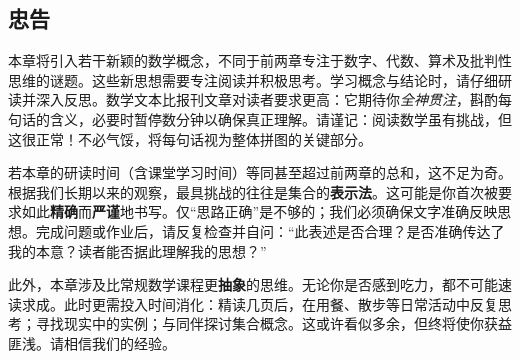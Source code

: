 \subsection{忠告}

本章将引入若干新颖的数学概念，不同于前两章专注于数字、代数、算术及批判性思维的谜题。这些新思想需要专注阅读并积极思考。学习概念与结论时，请仔细研读并深入反思。数学文本比报刊文章对读者要求更高：它期待你\emph{全神贯注}，斟酌每句话的含义，必要时暂停数分钟以确保真正理解。请谨记：阅读数学虽有挑战，但这很正常！不必气馁，将每句话视为整体拼图的关键部分。

若本章的研读时间（含课堂学习时间）等同甚至超过前两章的总和，这不足为奇。根据我们长期以来的观察，最具挑战的往往是集合的\textbf{表示法}。这可能是你首次被要求如此\textbf{精确}而\textbf{严谨}地书写。仅``思路正确''是不够的；我们必须确保文字准确反映思想。完成问题或作业后，请反复检查并自问：``此表述是否合理？是否准确传达了我的本意？读者能否据此理解我的思想？''

此外，本章涉及比常规数学课程更\textbf{抽象}的思维。无论你是否感到吃力，都不可能速读求成。此时更需投入时间消化：精读几页后，在用餐、散步等日常活动中反复思考；寻找现实中的实例；与同伴探讨集合概念。这或许看似多余，但终将使你获益匪浅。请相信我们的经验。
